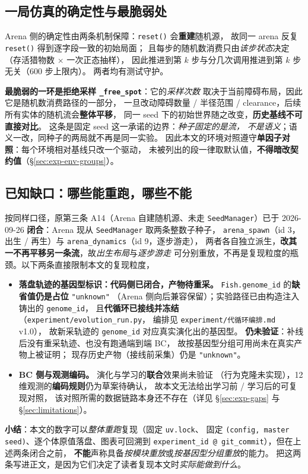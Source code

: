 \subsection{一局仿真的确定性与最脆弱处}

Arena 侧的确定性由两条机制保障：\texttt{reset()} 会\textbf{重建}随机源，
故同一 arena 反复 \texttt{reset()} 得到逐字段一致的初始局面；
且每步的随机数消费只由\emph{该步状态}决定（存活猎物数 $\times$ 一次正态抽样），
因此推进到第 $k$ 步与分几次调用推进到第 $k$ 步无关（600 步上限内）。
两者均有测试守护。

\textbf{最脆弱的一环是拒绝采样 \texttt{\_free\_spot}}：它的\emph{采样次数}
取决于当前障碍布局，因此它是随机数消费路径的一部分，
一旦改动障碍数量 / 半径范围 / clearance，后续所有实体的随机流会\textbf{整体平移}，
同一 seed 下的初始世界随之改变，\textbf{历史基线不可直接对比}。
这条是固定 seed 这一承诺的边界：\emph{种子固定的是流，
不是语义}；语义一改，同种子的两局就不再是同一实验。
因此本文的环境对照遵守\textbf{单因子对照}：每个环境相对基线只改一个驱动，
未被列出的段一律取默认值，\textbf{不得暗改契约值}（\S\ref{sec:exp-env-groups}）。

\subsection{已知缺口：哪些能重跑，哪些不能}

按同样口径，原第三条 A14（Arena 自建随机源、未走 \texttt{SeedManager}）已于
2026-09-26 \textbf{闭合}：Arena 现从 \texttt{SeedManager} 取两条整数子种子，
\texttt{arena\_spawn}（id 3，出生 / 再生）与 \texttt{arena\_dynamics}（id 9，逐步游走），
两者各自独立派生，\textbf{改其一不再平移另一条流}，故\emph{出生布局}与\emph{逐步游走}
可分别重放，不再是复现粒度的瓶颈。以下两条直接限制本文的复现粒度，

\begin{itemize}
  \item \textbf{落盘轨迹的基因型标识：代码侧已闭合，产物待重采。}
        \texttt{Fish.genome\_id} 的\textbf{缺省值仍是占位} \texttt{"unknown"}
        （Arena 侧向后兼容保留）；实验路径已由构造注入铸出的 \texttt{genome\_id}，
        且\textbf{代循环已接线并冻结}（\texttt{experiment/evolution\_run.py}，
        编排见 \texttt{experiment/代循环编排.md} v1.0），
        故新采轨迹的 \texttt{genome\_id} 对应真实演化出的基因型。
        \textbf{仍未验证}：补线后没有重采轨迹、也没有跑通端到端 BC，
        故按基因型分组可用尚未在真实产物上被证明；
        现存历史产物（接线前采集）仍是 \texttt{"unknown"}。
  \item \textbf{BC 侧与观测编码。} 演化与学习的\textbf{联合}效果尚未验证
        （行为克隆未实现），12 维观测的\textbf{编码规则}仍为草案待确认，
        故本文无法给出学习前 / 学习后的可复现对照，
        该对照所需的数据链路本身还不存在（详见 \S\ref{sec:exp-gaps} 与
        \S\ref{sec:limitations}）。
\end{itemize}

\textbf{小结}：本文的数字可以\emph{整体重跑}复现（固定 \texttt{uv.lock}、
固定 \texttt{(config, master seed)}、逐个体原值落盘、图表可回溯到
\texttt{experiment\_id @ git\_commit}），但在上述两条闭合之前，
\textbf{不能}声称具备\emph{按模块重放}或\emph{按基因型分组重放}的能力。
把这两条写进正文，是因为它们决定了读者复现本文时\emph{实际能做到什么}。
